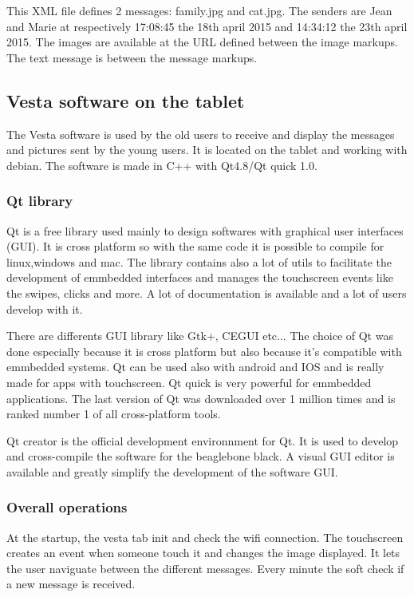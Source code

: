 This XML file defines 2 messages: family.jpg and cat.jpg. The senders are Jean and Marie at respectively 17:08:45 the 18th april 2015 and 14:34:12 the 23th april 2015. The images are available at the URL defined between the image markups. The text message is between the message markups.

\clearpage

\subsection{Vesta software on the tablet}
The Vesta software is used by the old users to receive and display the messages and pictures sent by the young users. It is located on the tablet and working with debian. The software is made in C++ with Qt4.8/Qt quick 1.0.

\subsubsection{Qt library}
Qt is a free library used mainly to design softwares with graphical user interfaces (GUI). It is cross platform so with the same code it is possible to compile for linux,windows and mac.
The library contains also a lot of utils to facilitate the development of emmbedded interfaces and manages the touchscreen events like the swipes, clicks and more. A lot of documentation is available and a lot of users develop with it.

There are differents GUI library like Gtk+, CEGUI etc... The choice of Qt was done especially because it is cross platform but also because it's compatible with emmbedded systems. Qt can be used also with android and IOS and is really made for apps with touchscreen. Qt quick is very powerful for emmbedded applications. The last version of Qt was downloaded over 1 million times and is ranked number 1 of all cross-platform tools.

Qt creator is the official development environnment for Qt. It is used to develop and cross-compile the software for the beaglebone black. A visual GUI editor is available and greatly simplify the development of the software GUI.

\clearpage

\subsubsection{Overall operations}
At the startup, the vesta tab init and check the wifi connection. The touchscreen creates an event when someone touch it and changes the image displayed. It lets the user naviguate between the different messages. Every minute the soft check if a new message is received.

